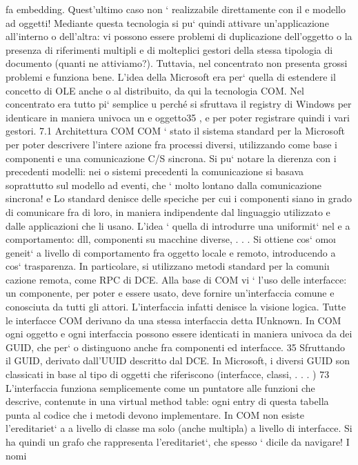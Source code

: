 \documentclass[a4paper,12pt]{article}
\begin{document}
fa embedding. Quest'ultimo caso non ` realizzabile direttamente con il
e
modello ad oggetti!
Mediante questa tecnologia si pu` quindi attivare un'applicazione all'interno
o
dell'altra: vi possono essere problemi di duplicazione dell'oggetto o la presenza
di riferimenti multipli e di molteplici gestori della stessa tipologia di documento
(quanti ne attiviamo?). Tuttavia, nel concentrato non presenta grossi problemi
e funziona bene.
L'idea della Microsoft era per` quella di estendere il concetto di OLE anche
o
al distribuito, da qui la tecnologia COM. Nel concentrato era tutto pi` semplice
u
perché si sfruttava il registry di Windows per identicare in maniera univoca un
e
oggetto35 , e per poter registrare quindi i vari gestori.
7.1
Architettura COM
COM ` stato il sistema standard per la Microsoft per poter descrivere l'intere
azione fra processi diversi, utilizzando come base i componenti e una comunicazione C/S sincrona. Si pu` notare la
dierenza con i precedenti modelli: nei
o
sistemi precedenti la comunicazione si basava soprattutto sul modello ad eventi,
che ` molto lontano dalla comunicazione sincrona!
e
Lo standard denisce delle speciche per cui i componenti siano in grado
di comunicare fra di loro, in maniera indipendente dal linguaggio utilizzato e
dalle applicazioni che li usano. L'idea ` quella di introdurre una uniformit` nel
e
a
comportamento: dll, componenti su macchine diverse, . . . Si ottiene cos` omo\i{}
geneit` a livello di comportamento fra oggetto locale e remoto, introducendo
a
cos` trasparenza. In particolare, si utilizzano metodi standard per la comuni\i{}
cazione remota, come RPC di DCE.
Alla base di COM vi ` l'uso delle interfacce: un componente, per poter
e
essere usato, deve fornire un'interfaccia comune e conosciuta da tutti gli attori. L'interfaccia infatti denisce la
visione logica. Tutte le interfacce COM
derivano da una stessa interfaccia detta IUnknown. In COM ogni oggetto e ogni
interfaccia possono essere identicati in maniera univoca da dei GUID, che per`
o
distinguono anche fra componenti ed interfacce.
35 Sfruttando il GUID, derivato dall'UUID descritto dal DCE. In Microsoft, i diversi GUID
son classicati in base al tipo di oggetti che riferiscono (interfacce, classi, . . . )
73
\newpage
L'interfaccia funziona semplicemente come un puntatore alle funzioni che descrive, contenute in una virtual method
table: ogni entry di questa tabella punta
al codice che i metodi devono implementare. In COM non esiste l'ereditariet`
a
a livello di classe ma solo (anche multipla) a livello di interfacce. Si ha quindi
un grafo che rappresenta l'ereditariet`, che spesso ` dicile da navigare! I nomi
\end{document}
